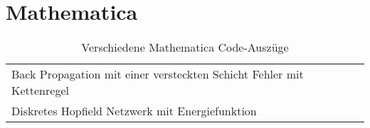\section{Mathematica}
\begin{table}[!h]
	\begin{tabularx}{\textwidth}{p{6cm} X}
		Back Propagation mit einer versteckten Schicht Fehler mit Kettenregel &
		\vspace{-5mm}
		 \\
		Diskretes Hopfield Netzwerk mit Energiefunktion &
		\vspace{-5mm}
		
	\end{tabularx}
	\caption{Verschiedene Mathematica Code-Auszüge}
	\label{tab:mathematica}
\end{table}

